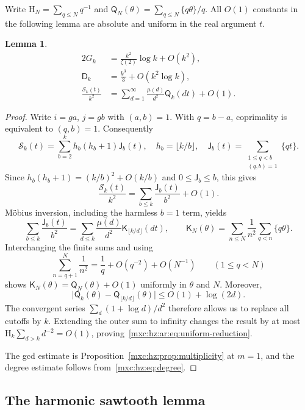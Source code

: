 \documentclass[11pt]{article}
\numberwithin{equation}{section}
\newtheorem{lemma}[theorem]{Lemma}
\theoremstyle{definition}
\theoremstyle{remark}
\begin{document}
Write $\mathrm H_N=\sum_{q\le N}q^{-1}$ and
$\mathsf Q_N(\theta)=\sum_{q\le N}\{q\theta\}/q$. All $O(1)$ constants in
the following lemma are absolute and uniform in the real argument $t$.

\begin{lemma}\label{mxc:hz:ar:lem:reduction}
\begin{align}
 2G_k&=\frac{k^2}{\zeta(2)}\log k+O(k^2),\label{mxc:hz:ar:eq:g}\\
 \mathsf D_k&=\frac{k^3}{3}+O(k^2\log k),\label{mxc:hz:ar:eq:d}\\
 \frac{\mathcal S_k(t)}{k^2}
 &=\sum_{d=1}^{\infty}\frac{\mu(d)}{d^2}\mathsf Q_k(dt)+O(1).
 \label{mxc:hz:ar:eq:uniform-reduction}
\end{align}
\end{lemma}

\begin{proof}
Write $i=ga$, $j=gb$ with $(a,b)=1$. With $q=b-a$, coprimality is
equivalent to $(q,b)=1$. Consequently
\[
 \mathcal S_k(t)=\sum_{b=2}^k h_b(h_b+1)\mathsf J_b(t),\quad
 h_b=\lfloor k/b\rfloor,\quad
 \mathsf J_b(t)=\sum_{\substack{1\le q<b\\(q,b)=1}}\{qt\}.
\]
Since $h_b(h_b+1)=(k/b)^2+O(k/b)$ and $0\le\mathsf J_b\le b$, this gives
\[
 \frac{\mathcal S_k(t)}{k^2}=\sum_{b\le k}\frac{\mathsf J_b(t)}{b^2}+O(1).
\]
M\"obius inversion, including the harmless $b=1$ term, yields
\[
 \sum_{b\le k}\frac{\mathsf J_b(t)}{b^2}
 =\sum_{d\le k}\frac{\mu(d)}{d^2}
 \mathsf K_{\lfloor k/d\rfloor}(dt),\qquad
 \mathsf K_N(\theta)=\sum_{n\le N}\frac1{n^2}\sum_{q<n}\{q\theta\}.
\]
Interchanging the finite sums and using
\[
 \sum_{n=q+1}^N\frac1{n^2}=\frac1q+O(q^{-2})+O(N^{-1})
 \qquad(1\le q<N)
\]
shows $\mathsf K_N(\theta)=\mathsf Q_N(\theta)+O(1)$ uniformly in $\theta$
and $N$. Moreover,
\[
 \bigl|\mathsf Q_k(\theta)-\mathsf Q_{\lfloor k/d\rfloor}(\theta)\bigr|
 \le O(1)+\log(2d).
\]
The convergent series $\sum_d(1+\log d)/d^2$ therefore allows us to replace
all cutoffs by $k$. Extending the outer sum to infinity changes the result
by at most $\mathrm H_k\sum_{d>k}d^{-2}=O(1)$,
proving~\eqref{mxc:hz:ar:eq:uniform-reduction}.

The gcd estimate is Proposition~\ref{mxc:hz:prop:multiplicity} at $m=1$,
and the degree estimate follows from~\eqref{mxc:hz:eq:degree}.
\end{proof}

\subsection{The harmonic sawtooth lemma}
\end{document}
